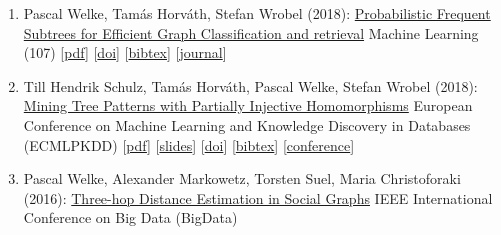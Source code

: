 \documentclass{scrartcl}
\begin{document}
\begin{enumerate}
\label{welke2019mach}
Pascal Welke, Tamás Horváth, Stefan Wrobel (2019):\newline
\href{https://dx.doi.org/10.1007/s10994-019-05779-1}{Probabilistic and Exact Frequent Subtree Mining in Graphs Beyond Forests}\newline
Machine Learning (108)\newline
{\footnotesize
[\href{https://pwelke.github.io/publications/welke2019mach.pdf}{pdf}]
[\href{https://dx.doi.org/10.1007/s10994-019-05779-1}{doi}]
[\href{https://dblp.org/rec/journals/ml/WelkeHW19.bib}{bibtex}]
[\href{https://link.springer.com/journal/10994}{journal}]
}
\item
\label{welke2018mach}
Pascal Welke, Tamás Horváth, Stefan Wrobel (2018):\newline
\href{https://dx.doi.org/10.1007/s10994-017-5688-7}{Probabilistic Frequent Subtrees for Efficient Graph Classification
and retrieval}\newline
Machine Learning (107)\newline
{\footnotesize
[\href{https://pwelke.github.io/publications/welke2018mach.pdf}{pdf}]
[\href{https://dx.doi.org/10.1007/s10994-017-5688-7}{doi}]
[\href{https://dblp.org/rec/journals/ml/WelkeHW18.bib}{bibtex}]
[\href{https://link.springer.com/journal/10994}{journal}]
}
\item
\label{schulz2018ecml}
Till Hendrik Schulz, Tamás Horváth, Pascal Welke, Stefan Wrobel (2018):\newline
\href{https://dx.doi.org/10.1007/978-3-030-10928-8_35}{Mining Tree Patterns with Partially Injective Homomorphisms}\newline
European Conference on Machine Learning and Knowledge Discovery in Databases (ECMLPKDD)\newline
{\footnotesize
[\href{https://pwelke.github.io/publications/schulz2018ecml.pdf}{pdf}]
[\href{https://pwelke.github.io/publications/schulz2018ecml-slides.pdf}{slides}]
[\href{https://dx.doi.org/10.1007/978-3-030-10928-8_35}{doi}]
[\href{https://dblp.org/rec/conf/pkdd/SchulzHWW18.bib}{bibtex}]
[\href{http://www.ecmlpkdd2018.org/accepted-papers-by-track-2/#paperid-417}{conference}]
}
\item
\label{welke2016threehop}
Pascal Welke, Alexander Markowetz, Torsten Suel, Maria Christoforaki (2016):\newline
\href{https://dx.doi.org/10.1109/BigData.2016.7840706}{Three-hop Distance Estimation in Social Graphs}\newline
IEEE International Conference on Big Data (BigData)\newline

\end{enumerate}
\end{document}
